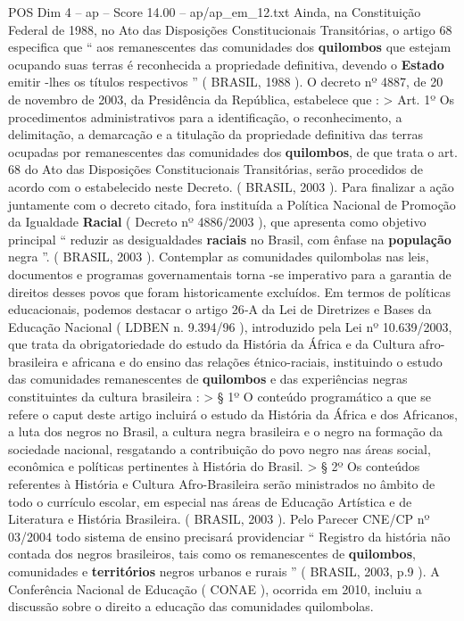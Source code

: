 \begin{textsample}{POS Dim 4 – ap – Score 14.00 – ap/ap\_em\_12.txt}
Ainda, na Constituição Federal de 1988, no Ato das Disposições Constitucionais Transitórias, o artigo 68 especifica que “ aos remanescentes das comunidades dos \textbf{quilombos} que estejam ocupando suas terras é reconhecida a propriedade definitiva, devendo o \textbf{Estado} emitir -lhes os títulos respectivos ” ( BRASIL, 1988 ).
O decreto nº 4887, de 20 de novembro de 2003, da Presidência da República, estabelece que : > Art. 1º Os procedimentos administrativos para a identificação, o reconhecimento, a delimitação, a demarcação e a titulação da propriedade definitiva das terras ocupadas por remanescentes das comunidades dos \textbf{quilombos}, de que trata o art. 68 do Ato das Disposições Constitucionais Transitórias, serão procedidos de acordo com o estabelecido neste Decreto. ( BRASIL, 2003 ).
Para finalizar a ação juntamente com o decreto citado, fora instituída a Política Nacional de Promoção da Igualdade \textbf{Racial} ( Decreto nº 4886/2003 ), que apresenta como objetivo principal “ reduzir as desigualdades \textbf{raciais} no Brasil, com ênfase na \textbf{população} negra ”. ( BRASIL, 2003 ).
Contemplar as comunidades quilombolas nas leis, documentos e programas governamentais torna -se imperativo para a garantia de direitos desses povos que foram historicamente excluídos.
Em termos de políticas educacionais, podemos destacar o artigo 26‐A da Lei de Diretrizes e Bases da Educação Nacional ( LDBEN n. 9.394/96 ), introduzido pela Lei nº 10.639/2003, que trata da obrigatoriedade do estudo da História da África e da Cultura afro-brasileira e africana e do ensino das relações étnico-raciais, instituindo o estudo das comunidades remanescentes de \textbf{quilombos} e das experiências negras constituintes da cultura brasileira : > § 1º O conteúdo programático a que se refere o caput deste artigo incluirá o estudo da História da África e dos Africanos, a luta dos negros no Brasil, a cultura negra brasileira e o negro na formação da sociedade nacional, resgatando a contribuição do povo negro nas áreas social, econômica e políticas pertinentes à História do Brasil. > § 2º Os conteúdos referentes à História e Cultura Afro-Brasileira serão ministrados no âmbito de todo o currículo escolar, em especial nas áreas de Educação Artística e de Literatura e História Brasileira. ( BRASIL, 2003 ).
Pelo Parecer CNE/CP nº 03/2004 todo sistema de ensino precisará providenciar “ Registro da história não contada dos negros brasileiros, tais como os remanescentes de \textbf{quilombos}, comunidades e \textbf{territórios} negros urbanos e rurais ” ( BRASIL, 2003, p.9 ).
A Conferência Nacional de Educação ( CONAE ), ocorrida em 2010, incluiu a discussão sobre o direito a educação das comunidades quilombolas.

\end{textsample}
